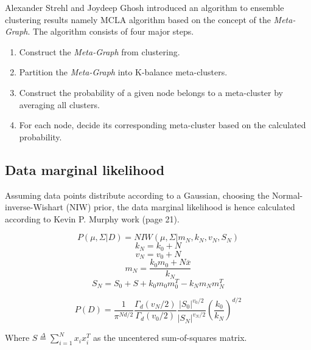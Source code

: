  Alexander Strehl and Joydeep Ghosh \cite{strehl2002cluster} introduced an algorithm to ensemble clustering results namely MCLA algorithm based on the concept of the \emph{Meta-Graph}. The algorithm consists of four major steps.
 \begin{enumerate}
     \item Construct the \emph{Meta-Graph} from clustering.
     \item Partition the \emph{Meta-Graph} into K-balance meta-clusters.
     \item Construct the probability of a given node belongs to a meta-cluster by averaging all clusters.
     \item For each node, decide its corresponding meta-cluster based on the calculated probability.
 \end{enumerate}
 
 
 \newpage
 \subsection{Data marginal likelihood}
 
Assuming data points distribute according to a Gaussian, choosing the Normal-inverse-Wishart (NIW) prior, the data marginal likelihood is hence calculated according to Kevin P. Murphy work \cite{murphy2007conjugate} (page 21).

\begin{equation}
    P(\mu, \Sigma | D) = NIW(\mu, \Sigma | m_N, k_N, v_N, S_N)
\end{equation}
\begin{equation}
    k_N = k_0 + N
\end{equation}
\begin{equation}
    v_N = v_0 + N
\end{equation}
\begin{equation}
    m_N = \frac{k_0 m_0 + N\overline{x}}{k_N}
\end{equation}
\begin{equation}
    S_N = S_0 + S + k_0 m_0 m_0^T - k_N m_N m_N^T
\end{equation}

\begin{equation}
    P(D) = \frac{1}{\pi^{Nd/2}} \frac{\Gamma_d(v_N/2)}{\Gamma_d(v_0/2)} \frac{|S_0|^{v_0/2}}{|S_N|^{v_N/2}} (\frac{k_0}{k_N})^{d/2}
    \label{eq:table_likelihood}
\end{equation}

Where $S\overset{\Delta}{=} \sum_{i=1}^N x_ix_i^T$ as the uncentered sum-of-squares matrix.